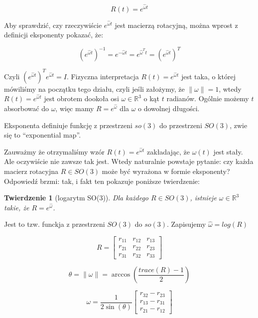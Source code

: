 \documentclass[a4paper,12pt]{article}
\newtheorem{theo}[defi]{Twierdzenie}
\newcommand{\RR}{\mathbb{R}^3}
\begin{document}
\begin{equation}
R(t) = e^{\hat{\omega}t}
\end{equation}

Aby sprawdzić, czy rzeczywiście $e^{\hat{\omega}t}$ jest macierzą rotacyjną, można wprost z definicji eksponenty pokazać, że:

\begin{equation}
(e^{\hat{\omega}t})^{-1}=e^{-\hat{\omega}t}=e^{\hat{\omega}^Tt}=(e^{\hat{\omega}t})^T
\end{equation}

Czyli $(e^{\hat{\omega}t})^Te^{\hat{\omega}t}=I$. Fizyczna interpretacja $R(t) = e^{\hat{\omega}t}$ jest taka, o której mówiliśmy na początku tego działu, czyli jeśli założymy, że $\| \omega \| = 1$, wtedy $R(t)=e^{\hat{\omega}t}$ jest obrotem dookoła osi $\omega \in \RR$ o kąt $t$ radianów. Ogólnie możemy $t$ absorbować do $\omega$, więc mamy $R = e^{\hat{\omega}}$ dla $\omega$ o dowolnej długości.

Eksponenta definiuje funkcję z przestrzeni $so(3)$ do przestrzeni $SO(3)$, zwie się to ``exponential map''. 

Zauważmy że otrzymaliśmy wzór $R(t) = e^{\hat{\omega}t}$ zakładając, że $\omega(t)$ jest stały. Ale oczywiście nie zawsze tak jest. Wtedy naturalnie powstaje pytanie: czy każda macierz rotacyjna $R \in SO(3)$ może być wyrażona w formie eksponenty? Odpowiedź brzmi: tak, i fakt ten pokazuje poniższe twierdzenie:

\begin{theo}[logarytm SO(3)]
Dla każdego $R \in SO(3)$, istnieje $\omega \in \RR$ takie, że $R = e^{\hat{\omega}}$. 
\end{theo}

\noindent Jest to tzw. funckja z przestrzeni $SO(3)$ do $so(3)$. Zapisujemy $\hat{\omega} = log(R)$

\begin{equation}
R = 
\begin{bmatrix}
  r_{11} & r_{12} & r_{13} \\
  r_{21} & r_{22} & r_{23} \\
  r_{31} & r_{32} & r_{33}
\end{bmatrix}
\end{equation}

\begin{equation}
\theta = \| \omega \| = \arccos(\frac{trace(R)-1}{2})
\end{equation}

\begin{equation}
\omega = \frac{1}{2\sin(\theta)}
\begin{bmatrix}
  r_{32} - r_{23} \\ r_{13} - r_{31} \\ r_{21} - r_{12}
\end{bmatrix}
\end{equation}
\end{document}
